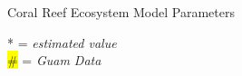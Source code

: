 \documentclass{beamer}
\begin{document}
\begin{frame}{Coral Reef Ecosystem Model Parameters}
{\begin{minipage}{1.20\textwidth}
\begin{table}
\end{table}
* = \textit{estimated value}\\
\colorbox{yellow}{\#} = \textit{Guam Data}
\end{minipage}}

\end{frame}
\end{document}
